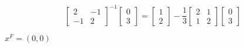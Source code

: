 \documentclass[12pt]{article}
\begin{document}
\begin{enumerate}
\begin{enumerate}
\begin{itemize}
\begin{equation*}
\begin{bmatrix}
                                                2  & -1 \\
                                                -1 & 2
                                          \end{bmatrix}^{-1}\begin{bmatrix}
                                                0 \\
                                                3
                                          \end{bmatrix}= \begin{bmatrix}
                                                1 \\
                                                2
                                          \end{bmatrix} - \frac{1}{3}\begin{bmatrix}
                                                2 & 1 \\
                                                1 & 2
                                          \end{bmatrix}\begin{bmatrix}
                                                0 \\
                                                3
                                          \end{bmatrix}
                                    \end{equation*}
                        \end{itemize}
                        $x^F = (0,0)$
            \end{enumerate}
\end{enumerate}
\end{document}
